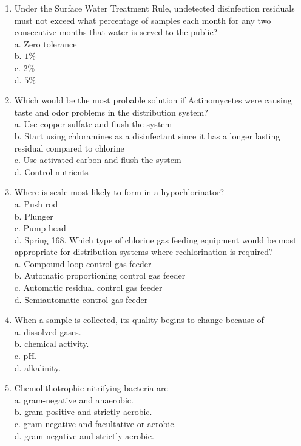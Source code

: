 \documentclass[10pt]{article}
\begin{document}
\begin{enumerate}
  \item Under the Surface Water Treatment Rule, undetected disinfection residuals must not exceed what percentage of samples each month for any two consecutive months that water is served to the public?\\
a. Zero tolerance\\
b. $1 \%$\\
c. $2 \%$\\
d. $5 \%$

  \item Which would be the most probable solution if Actinomycetes were causing taste and odor problems in the distribution system?\\
a. Use copper sulfate and flush the system\\
b. Start using chloramines as a disinfectant since it has a longer lasting residual compared to chlorine\\
c. Use activated carbon and flush the system\\
d. Control nutrients

  \item Where is scale most likely to form in a hypochlorinator?\\
a. Push rod\\
b. Plunger\\
c. Pump head\\
d. Spring 168. Which type of chlorine gas feeding equipment would be most appropriate for distribution systems where rechlorination is required?\\
a. Compound-loop control gas feeder\\
b. Automatic proportioning control gas feeder\\
c. Automatic residual control gas feeder\\
d. Semiautomatic control gas feeder

  \item When a sample is collected, its quality begins to change because of\\
a. dissolved gases.\\
b. chemical activity.\\
c. $\mathrm{pH}$.\\
d. alkalinity.

  \item Chemolithotrophic nitrifying bacteria are\\
a. gram-negative and anaerobic.\\
b. gram-positive and strictly aerobic.\\
c. gram-negative and facultative or aerobic.\\
d. gram-negative and strictly aerobic.


\end{enumerate}
\end{document}
